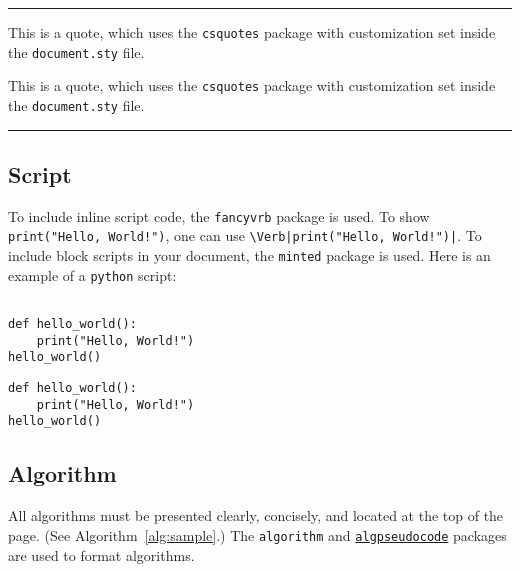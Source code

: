 \noindent\rule{\linewidth}{0.5pt}

\begin{multicols}{2}
  \begin{displayquote}
    This is a quote, which uses the \verb|csquotes| package with customization set inside the \verb|document.sty| file.
  \end{displayquote}
  \columnbreak{}
  \begin{latexcode}
\begin{displayquote}
  This is a quote, which uses the \verb|csquotes| package with customization set inside the \verb|document.sty| file.
\end{displayquote}
  \end{latexcode}
\end{multicols}

\noindent\rule{\linewidth}{0.5pt}

\subsection{Script}

To include inline script code, the \Verb|fancyvrb| package is used.
To show \Verb|print("Hello, World!")|, one can use \Verb+\Verb|print("Hello, World!")|+.
To include block scripts in your document, the \Verb|minted| package is used.
Here is an example of a \Verb|python| script:

\begin{multicols}{2}
  \begin{verbatim}

def hello_world():
    print("Hello, World!")
hello_world()
  \end{verbatim}
  \columnbreak{}
  \begin{latexcode}
\begin{verbatim}
def hello_world():
    print("Hello, World!")
hello_world()
\end{verbatim}
  \end{latexcode}
\end{multicols}


\subsection{Algorithm}

All algorithms must be presented clearly, concisely, and located at the top of the page.
(See Algorithm~\ref{alg:sample}.)
The \Verb|algorithm| and \href{https://www.ctan.org/pkg/algpseudocodex/}{\Verb|algpseudocode|} packages are used to format algorithms.

